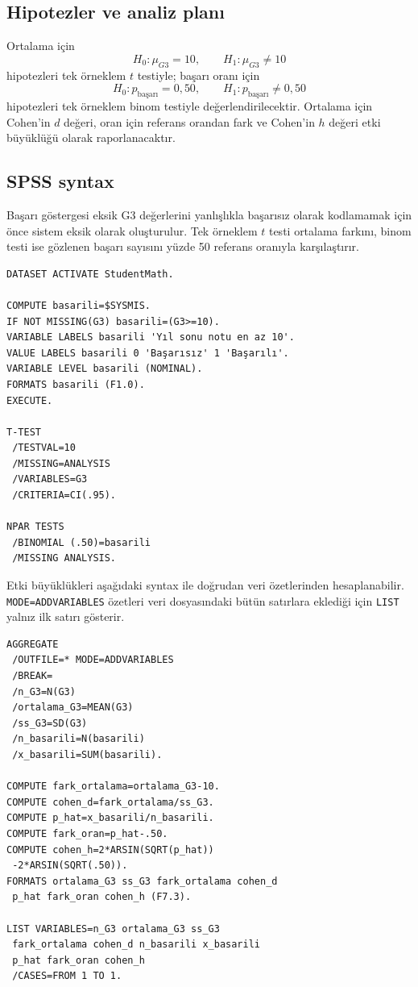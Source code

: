 \subsection{Hipotezler ve analiz planı}

Ortalama için
\[
H_0:\mu_{G3}=10,
\qquad
H_1:\mu_{G3}\neq10
\]
hipotezleri tek örneklem $t$ testiyle; başarı oranı için
\[
H_0:p_{\text{başarı}}=0{,}50,
\qquad
H_1:p_{\text{başarı}}\neq0{,}50
\]
hipotezleri tek örneklem binom testiyle değerlendirilecektir. Ortalama için
Cohen'in $d$ değeri, oran için referans orandan fark ve Cohen'in $h$ değeri
etki büyüklüğü olarak raporlanacaktır.

\subsection{SPSS syntax}

Başarı göstergesi eksik G3 değerlerini yanlışlıkla başarısız olarak
kodlamamak için önce sistem eksik olarak oluşturulur. Tek örneklem $t$ testi
ortalama farkını, binom testi ise gözlenen başarı sayısını yüzde 50 referans
oranıyla karşılaştırır.

\begin{lstlisting}[language={}]
DATASET ACTIVATE StudentMath.

COMPUTE basarili=$SYSMIS.
IF NOT MISSING(G3) basarili=(G3>=10).
VARIABLE LABELS basarili 'Yıl sonu notu en az 10'.
VALUE LABELS basarili 0 'Başarısız' 1 'Başarılı'.
VARIABLE LEVEL basarili (NOMINAL).
FORMATS basarili (F1.0).
EXECUTE.

T-TEST
 /TESTVAL=10
 /MISSING=ANALYSIS
 /VARIABLES=G3
 /CRITERIA=CI(.95).

NPAR TESTS
 /BINOMIAL (.50)=basarili
 /MISSING ANALYSIS.
\end{lstlisting}

Etki büyüklükleri aşağıdaki syntax ile doğrudan veri özetlerinden
hesaplanabilir. \texttt{MODE=ADDVARIABLES} özetleri veri dosyasındaki bütün
satırlara eklediği için \texttt{LIST} yalnız ilk satırı gösterir.

\begin{lstlisting}[language={}]
AGGREGATE
 /OUTFILE=* MODE=ADDVARIABLES
 /BREAK=
 /n_G3=N(G3)
 /ortalama_G3=MEAN(G3)
 /ss_G3=SD(G3)
 /n_basarili=N(basarili)
 /x_basarili=SUM(basarili).

COMPUTE fark_ortalama=ortalama_G3-10.
COMPUTE cohen_d=fark_ortalama/ss_G3.
COMPUTE p_hat=x_basarili/n_basarili.
COMPUTE fark_oran=p_hat-.50.
COMPUTE cohen_h=2*ARSIN(SQRT(p_hat))
 -2*ARSIN(SQRT(.50)).
FORMATS ortalama_G3 ss_G3 fark_ortalama cohen_d
 p_hat fark_oran cohen_h (F7.3).

LIST VARIABLES=n_G3 ortalama_G3 ss_G3
 fark_ortalama cohen_d n_basarili x_basarili
 p_hat fark_oran cohen_h
 /CASES=FROM 1 TO 1.
\end{lstlisting}

